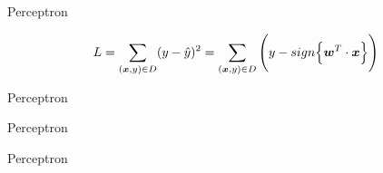 %
%
%

\begin{frame}[t]{Perceptron}

    \begin{equation}
        L = \sum_{(\boldsymbol{x},y) \in D} (y - \hat{y})^2 
          = \sum_{(\boldsymbol{x},y) \in D} \Bigg(y - sign\Big\{ \boldsymbol{w}^T \cdot \boldsymbol{x} \Big\}\Bigg)
     \end{equation}


\end{frame}

%
%
%

\begin{frame}[t]{Perceptron}

\end{frame}

%
%
%

\begin{frame}[t]{Perceptron}

\end{frame}

%
%
%

\begin{frame}[t]{Perceptron}

\end{frame}
